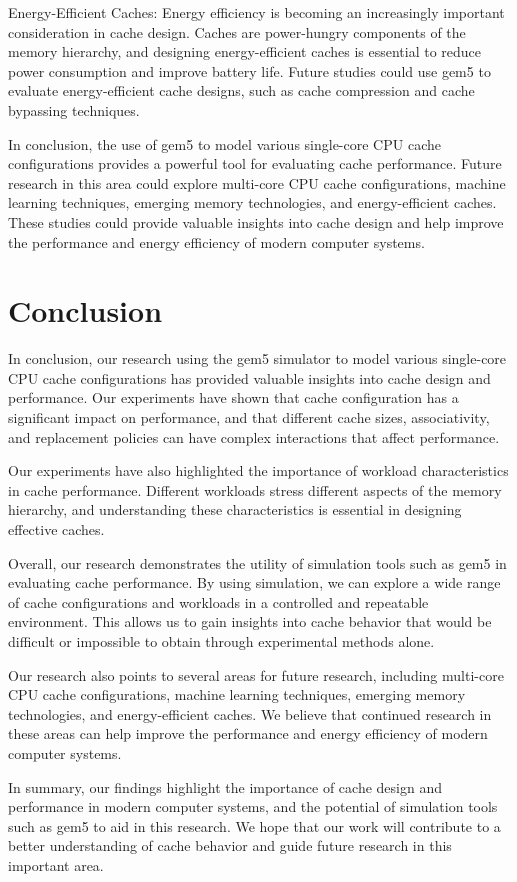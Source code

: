 \documentclass[conference]{IEEEtran}
\begin{document}
Energy-Efficient Caches: Energy efficiency is becoming an increasingly important consideration in cache design. Caches are power-hungry components of the memory hierarchy, and designing energy-efficient caches is essential to reduce power consumption and improve battery life. Future studies could use gem5 to evaluate energy-efficient cache designs, such as cache compression and cache bypassing techniques.

In conclusion, the use of gem5 to model various single-core CPU cache configurations provides a powerful tool for evaluating cache performance. Future research in this area could explore multi-core CPU cache configurations, machine learning techniques, emerging memory technologies, and energy-efficient caches. These studies could provide valuable insights into cache design and help improve the performance and energy efficiency of modern computer systems.

\section{Conclusion}
In conclusion, our research using the gem5 simulator to model various single-core CPU cache configurations has provided valuable insights into cache design and performance. Our experiments have shown that cache configuration has a significant impact on performance, and that different cache sizes, associativity, and replacement policies can have complex interactions that affect performance.

Our experiments have also highlighted the importance of workload characteristics in cache performance. Different workloads stress different aspects of the memory hierarchy, and understanding these characteristics is essential in designing effective caches.

Overall, our research demonstrates the utility of simulation tools such as gem5 in evaluating cache performance. By using simulation, we can explore a wide range of cache configurations and workloads in a controlled and repeatable environment. This allows us to gain insights into cache behavior that would be difficult or impossible to obtain through experimental methods alone.

Our research also points to several areas for future research, including multi-core CPU cache configurations, machine learning techniques, emerging memory technologies, and energy-efficient caches. We believe that continued research in these areas can help improve the performance and energy efficiency of modern computer systems.

In summary, our findings highlight the importance of cache design and performance in modern computer systems, and the potential of simulation tools such as gem5 to aid in this research. We hope that our work will contribute to a better understanding of cache behavior and guide future research in this important area.

\printbibliography
\end{document}
